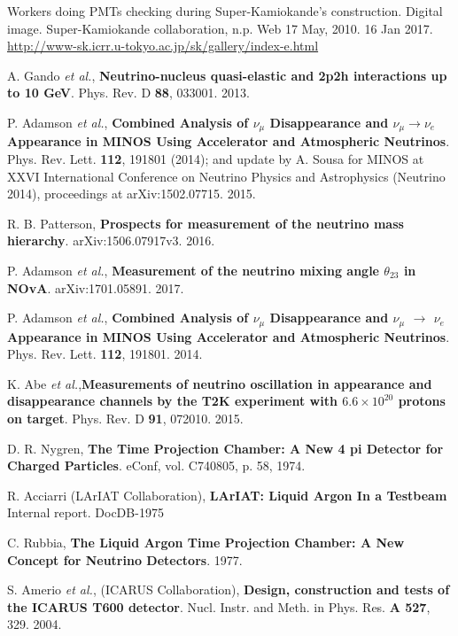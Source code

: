  Workers doing PMTs checking during Super-Kamiokande's construction. Digital image. Super-Kamiokande collaboration, n.p. Web 17 May, 2010. 16 Jan 2017. \href{http://www-sk.icrr.u-tokyo.ac.jp/sk/gallery/index-e.html}{http://www-sk.icrr.u-tokyo.ac.jp/sk/gallery/index-e.html}

 A. Gando \textit{et al.}, \textbf{Neutrino-nucleus quasi-elastic and 2p2h interactions up to 10 GeV}. Phys. Rev. D \textbf{88}, 033001. 2013.

 P. Adamson \textit{et al.}, \textbf{Combined Analysis of $\nu_\mu$ Disappearance and $\nu_\mu \rightarrow \nu_e$ Appearance in MINOS Using Accelerator and Atmospheric Neutrinos}. Phys. Rev. Lett. \textbf{112}, 191801 (2014); and update by A. Sousa for MINOS at XXVI International
Conference on Neutrino Physics and Astrophysics (Neutrino 2014), proceedings at arXiv:1502.07715. 2015.

 R. B. Patterson, \textbf{Prospects for measurement of the neutrino mass hierarchy}. arXiv:1506.07917v3. 2016.

 P. Adamson \textit{et al.}, \textbf{Measurement of the neutrino mixing angle $\theta_{23}$ in NOvA}. 	arXiv:1701.05891. 2017.

 P. Adamson \textit{et al.}, \textbf{Combined Analysis of $\nu_\mu$ Disappearance and $\nu_\mu$ $\rightarrow $ $\nu_e$ Appearance in MINOS Using Accelerator and Atmospheric Neutrinos}. Phys. Rev. Lett. \textbf{112}, 191801. 2014.

 K. Abe \textit{et al.},\textbf{Measurements of neutrino oscillation in appearance and disappearance channels by the T2K experiment with $6.6 \times 10^{20} $ protons on target}. Phys. Rev. D \textbf{91}, 072010. 2015.

 D. R. Nygren, \textbf{The Time Projection Chamber: A New 4 pi Detector for Charged Particles}. eConf, vol. C740805, p. 58, 1974.

 R. Acciarri (LArIAT Collaboration), \textbf{LArIAT:
Liquid Argon In a Testbeam} Internal report. DocDB-1975

 C. Rubbia, \textbf{The Liquid Argon Time Projection Chamber: A New Concept for Neutrino Detectors}. 1977.

 S. Amerio \textit{et al.}, (ICARUS Collaboration), \textbf{Design, construction and tests of the ICARUS T600 detector}. Nucl. Instr. and Meth. in Phys. Res. \textbf{A 527}, 329. 2004.

